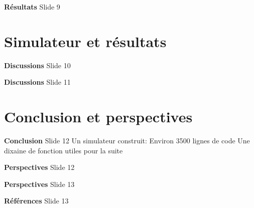 \documentclass[aspectratio=169,10pt]{beamer}
\begin{document}
\begin{frame}{\textbf{Résultats}}
    Slide 9
\end{frame}

\section{Simulateur et résultats}

\begin{frame}{\textbf{Discussions}}
    Slide 10
\end{frame}

\begin{frame}{\textbf{Discussions}}
    Slide 11
\end{frame}


\section{Conclusion et perspectives}
\begin{frame}{\textbf{Conclusion}}
    Slide 12
	Un simulateur construit:
		Environ 3500 lignes de code
		Une dixaine de fonction utiles pour la suite
\end{frame}

\begin{frame}{\textbf{Perspectives}}
    Slide 12
\end{frame}

\begin{frame}{\textbf{Perspectives}}
    Slide 13
\end{frame}

\begin{frame}{\textbf{Références}}
    Slide 13
\end{frame}
\end{document}
